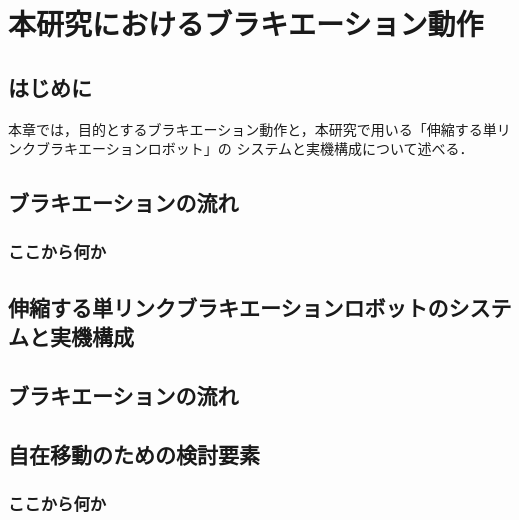 \chapter[本研究におけるブラキエーション動作]%
        {本研究におけるブラキエーション動作}
        \section{はじめに}
          本章では，目的とするブラキエーション動作と，本研究で用いる「伸縮する単リンクブラキエーションロボット」の
          システムと実機構成について述べる．


        \section{ブラキエーションの流れ}
        \subsection{ここから何か}

        \section{伸縮する単リンクブラキエーションロボットのシステムと実機構成}


        

        \section{ブラキエーションの流れ}
        \section{自在移動のための検討要素}
          \subsection{ここから何か}
